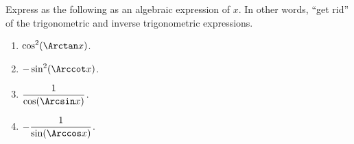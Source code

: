 Express as the following as an algebraic expression of $x$. In other words, ``get rid'' of the trigonometric and inverse trigonometric expressions.

\begin{multicols}{2}
\begin{enumerate}[ref={\fcProblemRef}]
\item $\displaystyle \cos^2(\Arctan x)$. 

\item \label{problem-sin^2(arccot x) } $\displaystyle -\sin^2(\Arccot x)$. 

\item $\displaystyle \frac{1}{\cos(\Arcsin x)}$. 

\item $\displaystyle -\frac{1}{\sin(\Arccos x)}$.

\end{enumerate}
\end{multicols}
